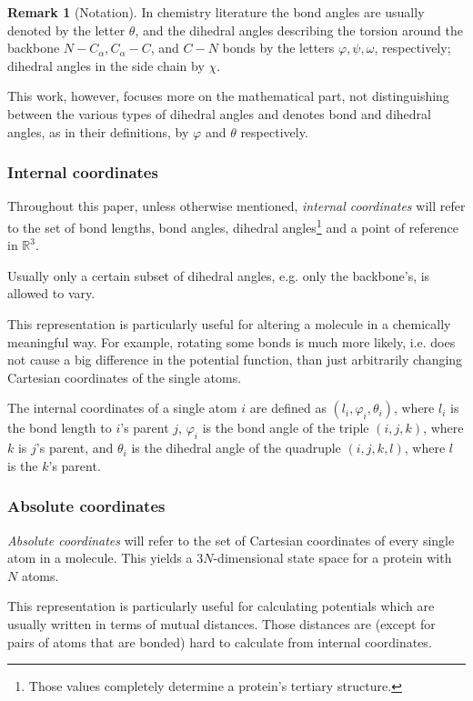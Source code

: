 \documentclass[12pt]{article}
\theoremstyle{definition}\newtheorem*{definition}{Definition}
\theoremstyle{definition}\newtheorem*{remark}{Remark}
\begin{document}
\begin{remark}[Notation]
In chemistry literature the bond angles are usually denoted by the letter $\theta$, and the dihedral angles describing the torsion around the backbone $N-C_\alpha, C_\alpha-C$, and $C-N$ bonds by the letters $\varphi,\psi,\omega$, respectively; dihedral angles in the side chain by $\chi$.

This work, however, focuses more on the mathematical part, not distinguishing between the various types of dihedral angles and denotes bond and dihedral angles, as in their definitions, by $\varphi$ and $\theta$ respectively.
\end{remark}


\subsubsection{Internal coordinates}\label{subsubsec:int_coords}
Throughout this paper, unless otherwise mentioned, \textit{internal coordinates} will refer to the set of bond lengths, bond angles, dihedral angles\footnote{Those values completely determine a protein's tertiary structure.} and a point of reference in $\mathbb R^3$.

Usually only a certain subset of dihedral angles, e.g. only the backbone's, is allowed to vary.

This representation is particularly useful for altering a molecule in a chemically meaningful way. For example, rotating some bonds is much more likely, i.e. does not cause a big difference in the potential function, than just arbitrarily changing Cartesian coordinates of the single atoms.

The internal coordinates of a single atom $i$ are defined as $(l_i,\varphi_i,\theta_i)$, where $l_i$ is the bond length to $i$'s parent $j$, $\varphi_i$ is the bond angle of the triple $(i,j,k)$, where $k$ is $j$'s parent, and $\theta_i$ is the dihedral angle of the quadruple $(i,j,k,l)$, where $l$ is the $k$'s parent.

\subsubsection{Absolute coordinates}\label{subsubsec:abs_coords}
\textit{Absolute coordinates} will refer to the set of Cartesian coordinates of every single atom in a molecule. This yields a $3N$-dimensional state space for a protein with $N$ atoms.

This representation is particularly useful for calculating potentials which are usually written in terms of mutual distances. Those distances are (except for pairs of atoms that are bonded) hard to calculate from internal coordinates.
\end{document}
